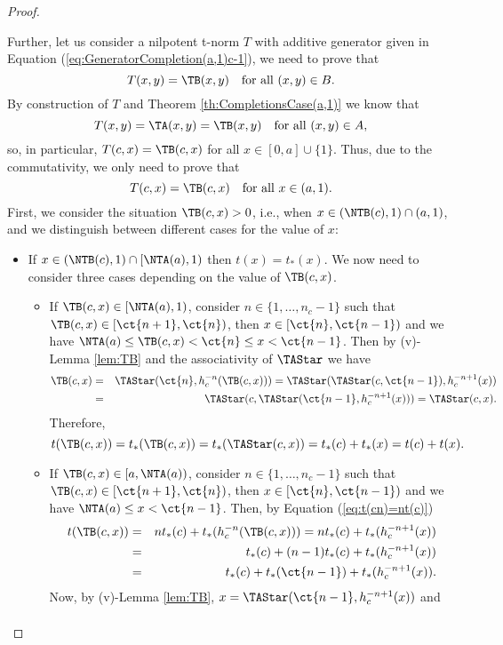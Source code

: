 \begin{proof}
\begin{enumerate}[label=(\roman*)]
\begin{itemize}
\begin{itemize}
			\end{itemize}
			Further, let us consider a nilpotent t-norm $T$ with additive generator given in Equation (\ref{eq:GeneratorCompletion(a,1)c-1}), we need to prove that
			$$T(x,y)=\TB(x,y) \quad \text{for all } (x,y) \in B.$$
			By construction of $T$ and Theorem \ref{th:CompletionsCase(a,1)} we know that
			$$T(x,y)= \TA(x,y)=\TB(x,y) \quad \text{for all } (x,y) \in A,$$
			so, in particular, $T(c,x)=\TB(c,x)$ for all $x \in [0,a] \cup \{1\}$. Thus, due to the commutativity, we only need to prove that
			$$T(c,x)=\TB(c,x) \quad \text{for all } x \in (a,1).$$
			First, we consider the situation $\TB(c,x)>0$, i.e., when $x \in (\NTB(c),1) \cap (a,1)$, and we distinguish between different cases for the value of $x$:
			\begin{itemize}
				\item If $x \in (\NTB(c),1) \cap [\NTA(a),1)$ then $t(x)=t_*(x)$. We now need to consider three cases depending on the value of $\TB(c,x)$.
				\begin{itemize}
					\item If $ \TB(c,x) \in [\NTA(a),1)$, consider $n \in \{1,\dots,n_c-1\}$ such that $\TB(c,x) \in [\ct{n+1},\ct{n})$, then $x \in [\ct{n},\ct{n-1})$ and we have $\NTA(a) \leq \TB(c,x) < \ct{n} \leq x < \ct{n-1}$. Then by (v)-Lemma \ref{lem:TB} and the associativity of $\TAStar$ we have
					\begin{eqnarray*}
						\TB(c,x) &=&\TAStar(\ct{n},h_c^{-n}(\TB(c,x)))= \TAStar(\TAStar(c,\ct{n-1}),h_c^{-n+1}(x)) \\
						&=& \TAStar(c,\TAStar(\ct{n-1},h_c^{-n+1}(x))) = \TAStar(c,x).
					\end{eqnarray*}
					Therefore,
					$$t(\TB(c,x))=t_*(\TB(c,x)) =  t_*(\TAStar(c,x)) = t_*(c)+t_*(x)=t(c)+t(x).$$
					\item If $ \TB(c,x) \in [a,\NTA(a))$, consider $n \in \{1,\dots,n_c-1\}$ such that $\TB(c,x) \in [\ct{n+1},\ct{n})$, then $ x \in [\ct{n},\ct{n-1})$  and we have $\NTA(a) \leq x < \ct{n-1}$. Then, by Equation (\ref{eq:t(cn)=nt(c)})
					\begin{eqnarray*}
						t(\TB(c,x)) &=& nt_*(c)+t_*(h_c^{-n}(\TB(c,x))) = nt_*(c)+t_*(h_c^{-n+1}(x)) \\ \nonumber &=& t_*(c) + (n-1)t_*(c)+t_*(h_c^{-n+1}(x)) \\
						&=& t_*(c) + t_*(\ct{n-1}) + t_*(h_c^{-n+1}(x)).
					\end{eqnarray*}
					Now, by (v)-Lemma \ref{lem:TB}, $x = \TAStar(\ct{n-1},h_c^{-n+1}(x))$ and
					\begin{eqnarray*}

\end{eqnarray*}
\end{itemize}
\end{itemize}
\end{itemize}
\end{enumerate}
\end{proof}

